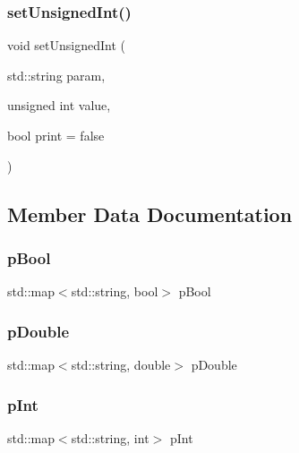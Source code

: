 \subsubsection{\texorpdfstring{setUnsignedInt()}{setUnsignedInt()}}
{\footnotesize\ttfamily void set\+Unsigned\+Int (\begin{DoxyParamCaption}\item[{std\+::string}]{param,  }\item[{unsigned int}]{value,  }\item[{bool}]{print = {\ttfamily false} }\end{DoxyParamCaption})}



\subsection{Member Data Documentation}
\mbox{\label{classparameters_class_abb7d3139bc101537c7f85fedfe94da2f}} 
\subsubsection{\texorpdfstring{pBool}{pBool}}
{\footnotesize\ttfamily std\+::map$<$std\+::string, bool$>$ p\+Bool\hspace{0.3cm}{\ttfamily [private]}}

\mbox{\label{classparameters_class_a1e0e610c04bda534bcd48bb81ad75ffc}} 
\subsubsection{\texorpdfstring{pDouble}{pDouble}}
{\footnotesize\ttfamily std\+::map$<$std\+::string, double$>$ p\+Double\hspace{0.3cm}{\ttfamily [private]}}

\mbox{\label{classparameters_class_ac8ac4bc08d6cb6aed011bb1d0fc1203f}} 
\subsubsection{\texorpdfstring{pInt}{pInt}}
{\footnotesize\ttfamily std\+::map$<$std\+::string, int$>$ p\+Int\hspace{0.3cm}{\ttfamily [private]}}

